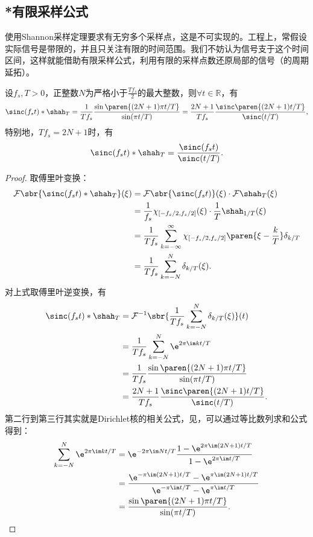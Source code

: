 \subsection{*有限采样公式}\label{sub:finite_sampling}

使用Shannon采样定理要求有无穷多个采样点，这是不可实现的。工程上，常假设实际信号是带限的，并且只关注有限的时间范围。我们不妨认为信号支于这个时间区间，这样就能借助有限采样公式，利用有限的采样点数还原局部的信号（的周期延拓）。

\begin{lemma}
    设$f_s,T>0$，正整数$N$为严格小于$\displaystyle\frac{T f_s}{2}$的最大整数，则$\forall t\in\mathbb{R}$，有
    \begin{equation}
        \sinc(f_s t)*\shah_T=\frac{1}{T f_s}\frac{\sin\paren{(2N+1)\pi t/T}}{\sin(\pi t/T)}=\frac{2N+1}{T f_s}\frac{\sinc\paren{(2N+1)t/T}}{\sinc(t/T)},
    \end{equation}
    特别地，$T f_s=2N+1$时，有
    \begin{equation}
        \sinc(f_s t)*\shah_T=\frac{\sinc(f_s t)}{\sinc(t/T)}.
    \end{equation}
\end{lemma}
\begin{proof}
    取傅里叶变换：
    \begin{align}
        \mathcal{F}\sbr{\sinc(f_s t)*\shah_T}(\xi)&=\mathcal{F}\sbr{\sinc(f_s t)}(\xi)\cdot\mathcal{F}\shah_T(\xi)\nonumber\\
        &=\frac{1}{f_s}\chi_{[-f_s/2,f_s/2]}(\xi)\cdot\frac{1}{T}\shah_{1/T}(\xi)\nonumber\\
        &=\frac{1}{T f_s}\sum_{k=-\infty}^{\infty}\chi_{[-f_s/2,f_s/2]}\paren{\xi-\frac{k}{T}}\delta_{k/T}\nonumber\\
        &=\frac{1}{T f_s}\sum_{k=-N}^{N}\delta_{k/T}(\xi).
    \end{align}
    对上式取傅里叶逆变换，有
    \begin{align}
        \sinc(f_s t)*\shah_T&=\mathcal{F}^{-1}\sbr{\frac{1}{T f_s}\sum_{k=-N}^{N}\delta_{k/T}(\xi)}(t)\nonumber\\
        &=\frac{1}{T f_s}\sum_{k=-N}^{N}\e^{2\pi\im kt/T}\nonumber\\
        &=\frac{1}{T f_s}\frac{\sin\paren{(2N+1)\pi t/T}}{\sin(\pi t/T)}\nonumber\\
        &=\frac{2N+1}{T f_s}\frac{\sinc\paren{(2N+1)t/T}}{\sinc(t/T)}.
    \end{align}
    第二行到第三行其实就是Dirichlet核的相关公式，见，可以通过等比数列求和公式得到：
    \begin{align}
        \sum_{k=-N}^{N}\e^{2\pi\im kt/T}&=\e^{-2\pi\im Nt/T}\frac{1-\e^{2\pi\im(2N+1)t/T}}{1-\e^{2\pi\im t/T}}\nonumber\\
        &=\frac{\e^{-\pi\im(2N+1)t/T}-\e^{\pi\im(2N+1)t/T}}{\e^{-\pi\im t/T}-\e^{\pi\im t/T}}\nonumber\\
        &=\frac{\sin\paren{(2N+1)\pi t/T}}{\sin(\pi t/T)}.
    \end{align}
\end{proof}

